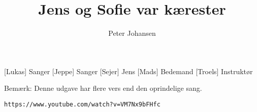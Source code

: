 \documentclass[a4paper,11pt]{article}
\title{Jens og Sofie var kærester}
\author{Peter Johansen}
\begin{document}
\maketitle

\begin{roles}
  [Lukas] Sanger
  [Jeppe] Sanger
  [Sejer] Jens
  [Mads] Bedemand
  [Troels] Instruktør
\end{roles}

\begin{props}
\end{props}

Bemærk: Denne udgave har flere vers end den oprindelige sang.

\texttt{https://www.youtube.com/watch?v=VM7Nx9bFHfc}
\end{document}
